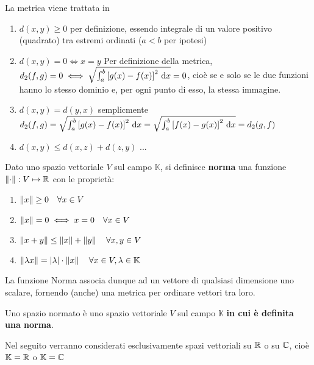 \begin{example}
\begin{enumerate}
		\label{ex:dim_dist_quadratica}
			\begin{note}
				La metrica viene trattata in 
			\end{note}
			\begin{enumerate}[label=\arabic*.]
				\item $d(x,y) \geq 0$ per definizione, essendo integrale di un valore positivo (quadrato) tra estremi ordinati ($a<b$ per ipotesi)
				\item $d(x,y) = 0 \iff x = y$ Per definizione della metrica, $d_2(f,g) = 0 \iff \sqrt{\int_a^b\left[g(x)-f(x)\right]^2 \,\mathrm{d}{x}} = 0$, cioè se e solo se le due funzioni hanno lo stesso dominio e, per ogni punto di esso, la stessa immagine.
				\item $d(x,y)=d(y,x)$ semplicmente $d_2(f,g) = \sqrt{\int_a^b\left[g(x)-f(x)\right]^2 \,\mathrm{d}{x}} = \sqrt{\int_a^b\left[f(x)-g(x)\right]^2 \,\mathrm{d}{x}} = d_2(g,f)$
				\item $d(x,y) \leq d(x,z) + d(z,y)$ ... %
			\end{enumerate}
	\end{enumerate}
\end{example}

\begin{definition}[Norma]
	\label{def:norma}
	Dato uno spazio vettoriale $V$ sul campo $\mathbb{K}$, si definisce \textbf{norma} una funzione $\left\|\cdot\right\|:V\mapsto\mathbb{R}$ con le proprietà:
	\begin{enumerate}
		\item $\left\|x\right\| \geq 0 \quad \forall x\in V$
		\item $\left\|x\right\|=0 \iff x = 0 \quad \forall x\in V$
		\item $\left\|x+y\right\| \leq \left\|x\right\|+\left\|y\right\| \quad \forall x,y\in V$
		\item $\left\|\lambda x\right\| = \left|\lambda\right| \cdot \left\|x\right\| \quad \forall x\in V,\lambda\in\mathbb{K}$
	\end{enumerate}
	\begin{note}
		La funzione Norma associa dunque ad un vettore di qualsiasi dimensione uno scalare, fornendo (anche) una metrica per ordinare vettori tra loro.
	\end{note}
\end{definition}
\begin{definition}
	Uno spazio normato è uno spazio vettoriale $V$ sul campo $\mathbb{K}$ \textbf{in cui è definita una norma}.
	\begin{note}
		Nel seguito verranno considerati esclusivamente spazi vettoriali su $\mathbb{R}$ o su $\mathbb{C}$, cioè $\mathbb{K} = \mathbb{R}$ o $\mathbb{K} = \mathbb{C}$
	\end{note}
\end{definition}

